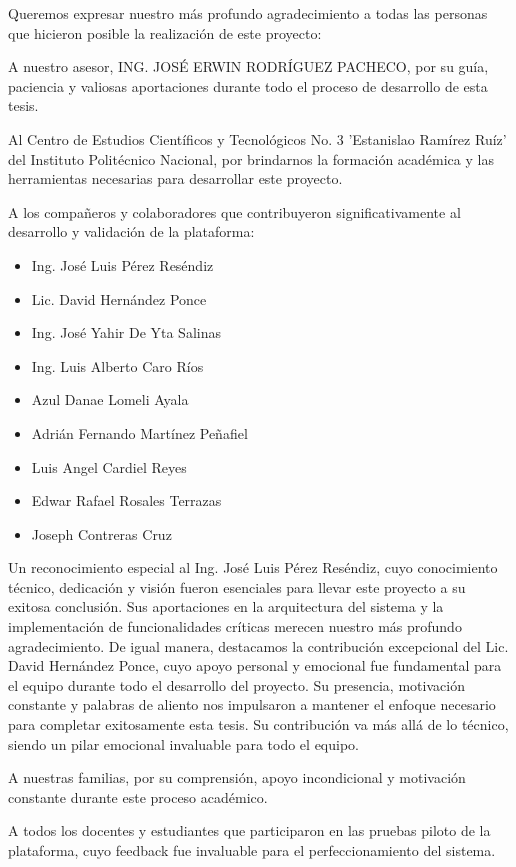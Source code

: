 \documentclass[12pt,a4paper]{report}
\begin{document}
Queremos expresar nuestro más profundo agradecimiento a todas las personas que hicieron posible la realización de este proyecto:

A nuestro asesor, ING. JOSÉ ERWIN RODRÍGUEZ PACHECO, por su guía, paciencia y valiosas aportaciones durante todo el proceso de desarrollo de esta tesis.

Al Centro de Estudios Científicos y Tecnológicos No. 3 'Estanislao Ramírez Ruíz' del Instituto Politécnico Nacional, por brindarnos la formación académica y las herramientas necesarias para desarrollar este proyecto.

A los compañeros y colaboradores que contribuyeron significativamente al desarrollo y validación de la plataforma:

\begin{itemize}
\item Ing. José Luis Pérez Reséndiz
\item Lic. David Hernández Ponce
\item Ing. José Yahir De Yta Salinas
\item Ing. Luis Alberto Caro Ríos
\item Azul Danae Lomeli Ayala
\item Adrián Fernando Martínez Peñafiel
\item Luis Angel Cardiel Reyes
\item Edwar Rafael Rosales Terrazas
\item Joseph Contreras Cruz
\end{itemize}

Un reconocimiento especial al Ing. José Luis Pérez Reséndiz, cuyo conocimiento técnico, dedicación y visión fueron esenciales para llevar este proyecto a su exitosa conclusión. Sus aportaciones en la arquitectura del sistema y la implementación de funcionalidades críticas merecen nuestro más profundo agradecimiento.
De igual manera, destacamos la contribución excepcional del Lic. David Hernández Ponce, cuyo apoyo personal y emocional fue fundamental para el equipo durante todo el desarrollo del proyecto. Su presencia, motivación constante y palabras de aliento nos impulsaron a mantener el enfoque necesario para completar exitosamente esta tesis. Su contribución va más allá de lo técnico, siendo un pilar emocional invaluable para todo el equipo. 

A nuestras familias, por su comprensión, apoyo incondicional y motivación constante durante este proceso académico.

A todos los docentes y estudiantes que participaron en las pruebas piloto de la plataforma, cuyo feedback fue invaluable para el perfeccionamiento del sistema.
\end{document}
